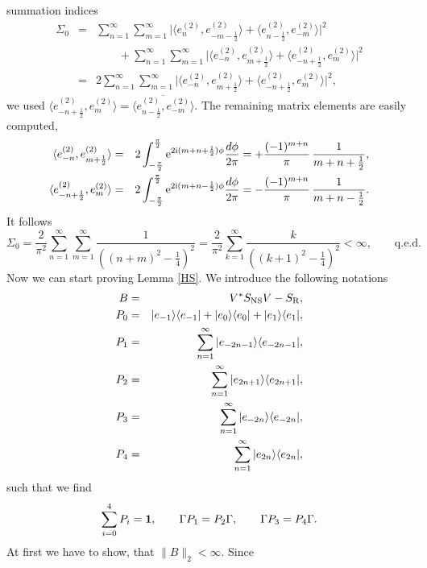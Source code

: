 \documentclass[10pt,a4paper]{article}
\begin{document}
\begin{appendix}
summation indices
\begin{eqnarray*}
\Sigma_0 &=& \sum_{n=1}^\infty \sum_{m=1}^\infty \Big|
\langle e_n^{(2)}, e_{-m-\frac{1}{2}}^{(2)} \rangle
+ \langle e_{n-\frac{1}{2}}^{(2)},e_{-m}^{(2)} \rangle
\Big|^2 \\ && \qquad
+ \sum_{n=1}^\infty \sum_{m=1}^\infty \Big|
\langle e_{-n}^{(2)}, e_{m+\frac{1}{2}}^{(2)} \rangle
+ \langle e_{-n+\frac{1}{2}}^{(2)},e_m^{(2)} \rangle
\Big|^2 \\
&=& 2 \sum_{n=1}^\infty \sum_{m=1}^\infty \Big|
\langle e_{-n}^{(2)}, e_{m+\frac{1}{2}}^{(2)} \rangle
+ \langle e_{-n+\frac{1}{2}}^{(2)},e_m^{(2)} \rangle
\Big|^2,
\end{eqnarray*}
we used $\langle e_{-n+\frac{1}{2}}^{(2)},e_m^{(2)} \rangle
= \overline{\langle e_{n-\frac{1}{2}}^{(2)}, e_{-m}^{(2)}
\rangle}$. The remaining matrix elements are easily
computed,
\begin{eqnarray*}
\langle e_{-n}^{(2)}, e_{m+\frac{1}{2}}^{(2)} \rangle &=&
2 \int_{-\frac{\pi}{2}}^\frac{\pi}{2} {\rm e}^{2{\rm i} (m+n+\frac{1}{2})
\phi} \frac{d\phi}{2\pi} = + \frac{(-1)^{m+n}}{\pi} \,
\frac{1}{m+n+\frac{1}{2}} , \\
\langle e_{-n+\frac{1}{2}}^{(2)}, e_m^{(2)} \rangle &=&
2 \int_{-\frac{\pi}{2}}^\frac{\pi}{2} {\rm e}^{2{\rm i} (m+n-\frac{1}{2})
\phi} \frac{d\phi}{2\pi} = - \frac{(-1)^{m+n}}{\pi} \,
\frac{1}{m+n-\frac{1}{2}}.
\end{eqnarray*}
It follows
\[ \Sigma_0 = \frac{2}{\pi^2} \sum_{n=1}^\infty
\sum_{m=1}^\infty \frac{1}{\left( (n+m)^2 - \frac{1}{4}
\right)^2} = \frac{2}{\pi^2} \sum_{k=1}^\infty
\frac{k}{\left( (k+1)^2 - \frac{1}{4} \right)^2}
< \infty, \qquad \mbox{q.e.d.} \]
Now we can start proving Lemma \ref{HS}.
We introduce the following notations
\begin{eqnarray*}
B &=& V^*S_{\rm NS}V-S_{\rm R},\\
P_0 &=& |e_{-1}\rangle\langle e_{-1}| +
|e_0 \rangle\langle e_0 | + |e_1 \rangle\langle e_1|,\\
P_1 &=&\sum_{n=1}^\infty |e_{-2n-1}\rangle\langle e_{-2n-1}|,\\
P_2 &=&\sum_{n=1}^\infty |e_{2n+1}\rangle\langle e_{2n+1}|,\\
P_3 &=&\sum_{n=1}^\infty |e_{-2n}\rangle\langle e_{-2n}|,\\
P_4 &=&\sum_{n=1}^\infty |e_{2n}\rangle\langle e_{2n}|,
\end{eqnarray*}
such that we find
\[ \sum_{i=0}^4 P_i = {\bf 1}, \qquad
\Gamma P_1 = P_2 \Gamma, \qquad
\Gamma P_3 = P_4 \Gamma. \]
At first we have to show, that $\|B\|_2<\infty$. Since

\end{appendix}
\end{document}
